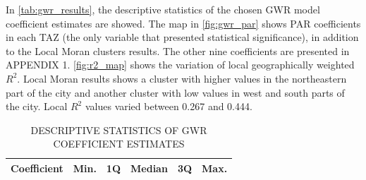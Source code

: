 
In \autoref{tab:gwr_results}, the descriptive statistics of the chosen GWR model coefficient estimates are showed. The map in \autoref{fig:gwr_par} shows PAR coefficients in each TAZ (the only variable that presented statistical significance), in addition to the Local Moran clusters results. The other nine coefficients are presented in APPENDIX 1. \autoref{fig:r2_map} shows the variation of local geographically weighted $R^2$. Local Moran results shows a cluster with higher values in the northeastern part of the city and another cluster with low values in west and south parts of the city. Local $R^2$ values varied between 0.267 and 0.444. 

\begin{table}[!htbp]
    \footnotesize
    \captionsetup{justification=raggedright,
        singlelinecheck=false,
        font=footnotesize}
    \caption{DESCRIPTIVE STATISTICS OF GWR COEFFICIENT ESTIMATES}
    \centering
    \begin{tabular}{lrrrrr}
        \hline
        \multicolumn{1}{c}{\textbf{Coefficient}} & \multicolumn{1}{c}{\textbf{Min.}} & \multicolumn{1}{c}{\textbf{1Q}} & \multicolumn{1}{c}{\textbf{Median}} & \multicolumn{1}{c}{\textbf{3Q}} & \multicolumn{1}{c}{\textbf{Max.}} \\
        \hline

\end{tabular}
\end{table}

